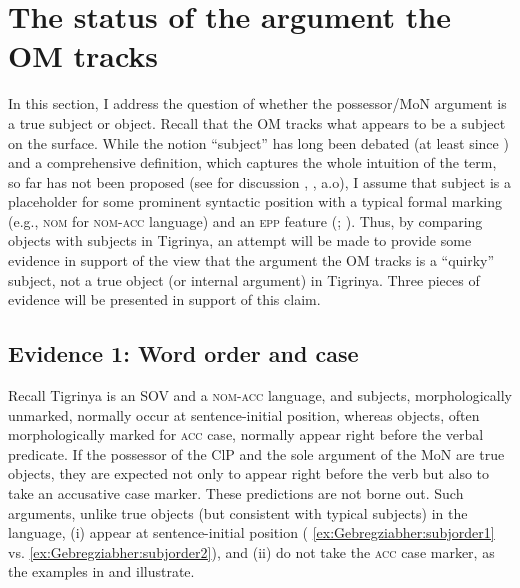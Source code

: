 \documentclass[output=paper]{langscibook}
\begin{document}
\section{The status of the argument the OM tracks}\label{ex:Gebregziabher:Why}\label{sec:gebregziabher:4}
In this section, I address the question of whether the possessor/MoN argument is a true subject or object. Recall that the OM tracks what appears to be a subject on the surface. While the notion ``subject'' has long been debated (at least since \citealt{keenan76}) and a comprehensive definition, which captures the whole intuition of the term, so far has not been proposed (see for discussion \citealt{mccloskey97}, \citealt{jaya2004}, a.o), I assume that subject is a placeholder for some prominent syntactic position with a typical formal marking (e.g., {\scshape nom} for {\scshape nom-acc} language) and an {\scshape epp} feature (\citealt{mccloskey97}; \citealt{chomsky2000}). Thus, by comparing objects with subjects in Tigrinya, an attempt will be made to provide some evidence in support of the view that the argument the OM tracks is a ``quirky'' subject, not a true object (or internal argument) in Tigrinya. Three pieces of evidence will be presented in support of this claim.
\subsection{Evidence 1: Word order and case} 

Recall Tigrinya is an SOV and a {\scshape nom-acc} language, and subjects, morphologically unmarked, normally occur at sentence-initial position, whereas objects, often morphologically marked for {\scshape acc} case, normally appear right before the verbal predicate. 
If the possessor of the ClP and the sole argument of the MoN are true objects, they are expected not only to appear right before the verb but also to take an accusative case marker. These predictions are not borne out.
Such arguments, unlike true objects (but consistent with typical subjects) in the language, (i) appear at sentence-initial position ( \ref{ex:Gebregziabher:subjorder1} vs. \ref{ex:Gebregziabher:subjorder2}), and (ii) do not take the {\scshape acc} case marker, as the examples  in  and  illustrate.
\end{document}
